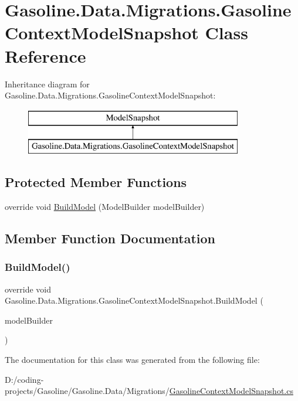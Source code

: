 \hypertarget{class_gasoline_1_1_data_1_1_migrations_1_1_gasoline_context_model_snapshot}{}\section{Gasoline.\+Data.\+Migrations.\+Gasoline\+Context\+Model\+Snapshot Class Reference}
\label{class_gasoline_1_1_data_1_1_migrations_1_1_gasoline_context_model_snapshot}
Inheritance diagram for Gasoline.\+Data.\+Migrations.\+Gasoline\+Context\+Model\+Snapshot\+:\begin{figure}[H]
\begin{center}
\leavevmode
\includegraphics[height=2.000000cm]{class_gasoline_1_1_data_1_1_migrations_1_1_gasoline_context_model_snapshot}
\end{center}
\end{figure}
\subsection*{Protected Member Functions}
\begin{DoxyCompactItemize}
\item 
override void \mbox{\hyperlink{class_gasoline_1_1_data_1_1_migrations_1_1_gasoline_context_model_snapshot_add6a065e3888adb714c368bbd6237bc1}{Build\+Model}} (Model\+Builder model\+Builder)
\end{DoxyCompactItemize}


\subsection{Member Function Documentation}
\mbox{\label{class_gasoline_1_1_data_1_1_migrations_1_1_gasoline_context_model_snapshot_add6a065e3888adb714c368bbd6237bc1}} 
\subsubsection{\texorpdfstring{BuildModel()}{BuildModel()}}
{\footnotesize\ttfamily override void Gasoline.\+Data.\+Migrations.\+Gasoline\+Context\+Model\+Snapshot.\+Build\+Model (\begin{DoxyParamCaption}\item[{Model\+Builder}]{model\+Builder }\end{DoxyParamCaption})\hspace{0.3cm}{\ttfamily [protected]}}



The documentation for this class was generated from the following file\+:\begin{DoxyCompactItemize}
\item 
D\+:/coding-\/projects/\+Gasoline/\+Gasoline.\+Data/\+Migrations/\mbox{\hyperlink{_gasoline_context_model_snapshot_8cs}{Gasoline\+Context\+Model\+Snapshot.\+cs}}\end{DoxyCompactItemize}
